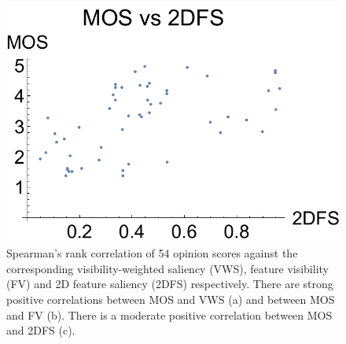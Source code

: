\begin{figure}
\begin{minipage}{.33\textwidth}
		\includegraphics[width=1\linewidth]{figures/mos_vs_2dfs}
	\end{minipage}
	\caption[Spearman's rank correlation of 54 opinion scores against the corresponding VWS, FV and 2DFS respectively]{Spearman's rank correlation of 54 opinion scores against the corresponding visibility-weighted saliency (VWS), feature visibility (FV) and 2D feature saliency (2DFS) respectively. There are strong positive correlations between MOS and VWS (a) and between MOS and FV (b). There is a moderate positive correlation between MOS and 2DFS (c).}
	\label{fig:mos_vs_vws}
\end{figure}


